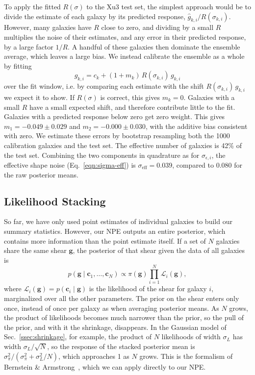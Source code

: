 To apply the fitted $R(\sigma)$ to the Xu3 test set, the simplest approach would be to divide the estimate of each galaxy by its predicted response, $\hat{g}_{k,i}/R(\sigma_{k,i})$. However, many galaxies have $R$ close to zero, and dividing by a small $R$ multiplies the noise of their estimates, and any error in their predicted response, by a large factor $1/R$. A handful of these galaxies then dominate the ensemble average, which leaves a large bias. We instead calibrate the ensemble as a whole by fitting
\begin{equation}
\label{eqn:ensemble-calibration}
    \hat{g}_{k,i} = c_k + (1+m_k)\, R(\sigma_{k,i})\, g_{k,i}
\end{equation}
over the fit window, i.e. by comparing each estimate with the shift $R(\sigma_{k,i})\,g_{k,i}$ we expect it to show. If $R(\sigma)$ is correct, this gives $m_k = 0$. Galaxies with a small $R$ have a small expected shift, and therefore contribute little to the fit. Galaxies with a predicted response below zero get zero weight. This gives $m_1 = -0.049 \pm 0.029$ and $m_2 = -0.000 \pm 0.030$, with the additive bias consistent with zero. We estimate these errors by bootstrap resampling both the 1000 calibration galaxies and the test set. The effective number of galaxies is 42\% of the test set. Combining the two components in quadrature as for $\sigma_{\epsilon,i}$, the effective shape noise (Eq.~\ref{eqn:sigma-eff}) is $\sigma_\mathrm{eff} = 0.039$, compared to 0.080 for the raw posterior means.

\subsection{Likelihood Stacking}
\label{ssec:stacking}

So far, we have only used point estimates of individual galaxies to build our summary statistics. However, our NPE outputs an entire posterior, which contains more information than the point estimate itself. If a set of $N$ galaxies share the same shear $\mathbf{g}$, the posterior of that shear given the data of all galaxies is
\begin{equation}
\label{eqn:stack}
    p(\mathbf{g} \mid \mathbf{c}_1, \dots, \mathbf{c}_N) \propto \pi(\mathbf{g}) \prod_{i=1}^{N} \mathcal{L}_i(\mathbf{g}),
\end{equation}
where $\mathcal{L}_i(\mathbf{g}) = p(\mathbf{c}_i \mid \mathbf{g})$ is the likelihood of the shear for galaxy $i$, marginalized over all the other parameters. The prior on the shear enters only once, instead of once per galaxy as when averaging posterior means. As $N$ grows, the product of likelihoods becomes much narrower than the prior, so the pull of the prior, and with it the shrinkage, disappears. In the Gaussian model of Sec.~\ref{ssec:shrinkage}, for example, the product of $N$ likelihoods of width $\sigma_L$ has width $\sigma_L/\sqrt{N}$, so the response of the stacked posterior mean is $\sigma_\pi^2/(\sigma_\pi^2 + \sigma_L^2/N)$, which approaches 1 as $N$ grows. This is the formalism of Bernstein \& Armstrong~\citep{BA14}, which we can apply directly to our NPE.


